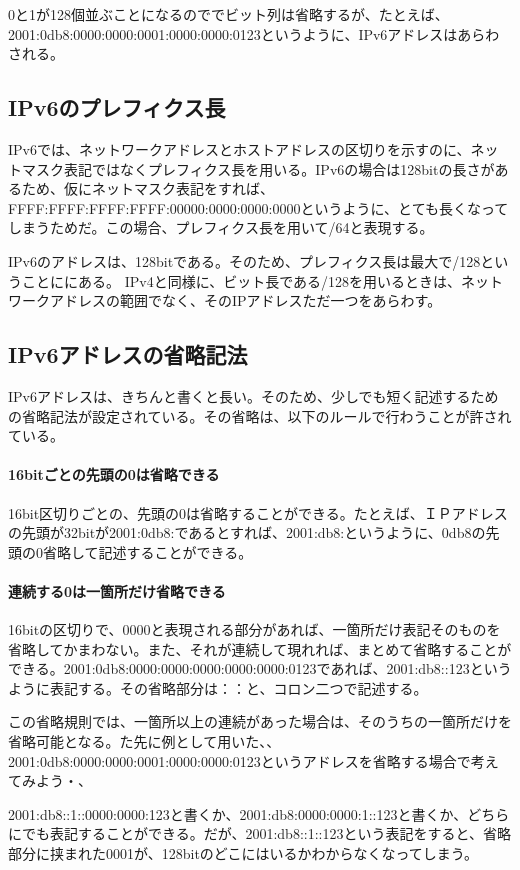 0と1が128個並ぶことになるのででビット列は省略するが、たとえば、2001:0db8:0000:0000:0001:0000:0000:0123というように、IPv6アドレスはあらわされる。


\subsection{IPv6のプレフィクス長}
IPv6では、ネットワークアドレスとホストアドレスの区切りを示すのに、ネットマスク表記ではなくプレフィクス長を用いる。IPv6の場合は128bitの長さがあるため、仮にネットマスク表記をすれば、FFFF:FFFF:FFFF:FFFF:00000:0000:0000:0000というように、とても長くなってしまうためだ。この場合、プレフィクス長を用いて/64と表現する。

IPv6のアドレスは、128bitである。そのため、プレフィクス長は最大で/128ということににある。
IPv4と同様に、ビット長である/128を用いるときは、ネットワークアドレスの範囲でなく、そのIPアドレスただ一つをあらわす。


\subsection{IPv6アドレスの省略記法}
IPv6アドレスは、きちんと書くと長い。そのため、少しでも短く記述するための省略記法が設定されている。その省略は、以下のルールで行わうことが許されている。

\paragraph{16bitごとの先頭の0は省略できる}
16bit区切りごとの、先頭の0は省略することができる。たとえば、ＩＰアドレスの先頭が32bitが2001:0db8:であるとすれば、2001:db8:というように、0db8の先頭の0省略して記述することができる。

\paragraph{連続する0は一箇所だけ省略できる}
16bitの区切りで、0000と表現される部分があれば、一箇所だけ表記そのものを省略してかまわない。また、それが連続して現れれば、まとめて省略することができる。2001:0db8:0000:0000:0000:0000:0000:0123であれば、2001:db8::123というように表記する。その省略部分は：：と、コロン二つで記述する。

この省略規則では、一箇所以上の連続があった場合は、そのうちの一箇所だけを省略可能となる。た先に例として用いた、、2001:0db8:0000:0000:0001:0000:0000:0123というアドレスを省略する場合で考えてみよう・、

2001:db8::1::0000:0000:123と書くか、2001:db8:0000:0000:1::123と書くか、どちらにでも表記することができる。だが、2001:db8::1::123という表記をすると、省略部分に挟まれた0001が、128bitのどこにはいるかわからなくなってしまう。

